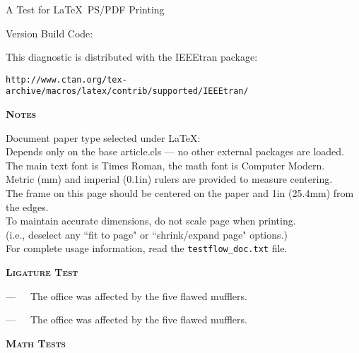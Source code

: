 \documentclass[\papertype, 10pt]{article}
\newcounter{textwidth}
\newlength{\help}
\newcounter{help}
\newcounter{in}
\newcounter{mm}
\newcounter{foo}
\newcounter{x}
\newcounter{y}
\begin{document}
\setlength{\help}{\textwidth}
\addtolength{\help}{-1.25in}

\vfill
\mbox{}\hfill
\begin{minipage}{\help}

\centerline{\Huge A Test for \LaTeX\ PS/PDF Printing}
\vspace{0.75\baselineskip}
\centerline{\large Version \docversion\hspace{0.2in} Build Code: \docbuildcode}
\vspace{0.75\baselineskip}
\centerline{\large This diagnostic is distributed with the IEEEtran package:}
\centerline{\texttt{\footnotesize http://www.ctan.org/tex-archive/macros/latex/contrib/supported/IEEEtran/}} 
\vspace{1.5\baselineskip}
\centerline{\large\bfseries\scshape Notes}
\vspace{0.5\baselineskip}

Document paper type selected under \LaTeX: \mbox{\ttfamily\papertype}\\
Depends only on the base article.cls --- no other external packages are loaded.\\
The main text font is Times Roman, the math font is Computer Modern.\\
Metric (mm) and imperial (0.1in) rulers are provided to measure centering.\\
The frame on this page should be centered on the paper and 1in (25.4mm) from the edges.\\
To maintain accurate dimensions, do not scale page when printing.\\
(i.e., deselect any ``fit to page" or ``shrink/expand page" options.)\\
For complete usage information, read the \texttt{testflow\_doc.txt} file.

\vspace{1.5\baselineskip}
\centerline{\large\bfseries\scshape Ligature Test}
\vspace{0.5\baselineskip}

 ---~~~The office was affected by the five flawed mufflers.

 ---~~~The of\/f\/ice was a\/f\/fected by the f\/ive f\/lawed muf\/f\/lers.


\vspace{1.5\baselineskip}
\centerline{\large\bfseries\scshape Math Tests}
\vspace{0.5\baselineskip}


\end{minipage}
\end{document}

